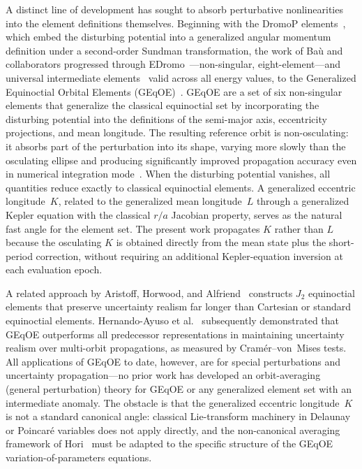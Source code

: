 A distinct line of development has sought to absorb perturbative
nonlinearities into the element definitions themselves.  Beginning with the
DromoP elements~\cite{bau2013}, which embed the disturbing potential into a
generalized angular momentum definition under a second-order Sundman
transformation, the work of Ba\`u and collaborators progressed through
EDromo~\cite{bau2015}---non-singular, eight-element---and universal
intermediate elements~\cite{bauroa2020} valid across all energy values, to
the Generalized Equinoctial Orbital Elements
(GEqOE)~\cite{bau2021}.  GEqOE are a set of six non-singular elements
that generalize the classical equinoctial set by incorporating the
disturbing potential into the definitions of the semi-major axis,
eccentricity projections, and mean longitude.  The resulting reference
orbit is non-osculating: it absorbs part of the perturbation into its
shape, varying more slowly than the osculating ellipse and producing
significantly improved propagation accuracy even in numerical integration
mode~\cite{bau2021}.  When the disturbing potential vanishes, all
quantities reduce exactly to classical equinoctial elements.  A
generalized eccentric longitude~$K$, related to the generalized mean
longitude~$L$ through a generalized Kepler equation with the classical
$r/a$ Jacobian property, serves as the natural fast angle for the element
set.  The present work propagates $K$ rather than $L$ because the
osculating $K$ is obtained directly from the mean state plus the
short-period correction, without requiring an additional Kepler-equation
inversion at each evaluation epoch.

A related approach by Aristoff, Horwood, and
Alfriend~\cite{aristoff2021} constructs $J_2$ equinoctial elements that
preserve uncertainty realism far longer than Cartesian or
standard equinoctial elements.  Hernando-Ayuso et
al.~\cite{hernandoayuso2023} subsequently demonstrated that GEqOE
outperforms all predecessor representations in maintaining uncertainty
realism over multi-orbit propagations, as measured by Cram\'er--von~Mises
tests.  All applications of GEqOE to date, however, are for special
perturbations and uncertainty propagation---no prior work has developed an
orbit-averaging (general perturbation) theory for GEqOE or any generalized
element set with an intermediate anomaly.  The obstacle is that the
generalized eccentric longitude~$K$ is not a standard canonical angle:
classical Lie-transform machinery in Delaunay or Poincar\'e variables does
not apply directly, and the non-canonical averaging framework of
Hori~\cite{hori1971} must be adapted to the specific structure of the
GEqOE variation-of-parameters equations.


